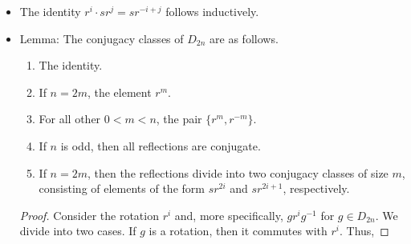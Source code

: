 \documentclass[../notes.tex]{subfiles}
\begin{document}
\begin{itemize}
\begin{figure}[H]
\begin{subfigure}[b]{0.3\linewidth}
            \caption{Rotation.}
            \label{fig:rotRefCommuteb}
        \end{subfigure}
        \caption{Commuting rotations and reflections.}
        \label{fig:rotRefCommute}
    \end{figure}
    \begin{proof}
        Let's consider the plane to be the complex plane, and represent points on the unit circle using the complex numbers $z=\e[i\gamma]$. In this case, we have that
        \begin{align*}
            s:\e[i\gamma] &\mapsto \e[i(2\alpha-\gamma)]&
            r:\e[i\gamma] &\mapsto \e[i(\gamma+\theta)]&
            r^{-1}:\e[i\gamma] &\mapsto \e[i(\gamma-\theta)]
        \end{align*}
        It follows that for any $\e[i\gamma]$ on the unit circle,
        \begin{equation*}
            [srs](\e[i\gamma]) = [sr](\e[i(2\alpha-\gamma)])
            = s(\e[i(2\alpha-\gamma+\theta)])
            = \e[i(2\alpha-(2\alpha-\gamma+\theta))]
            = \e[i(\gamma-\theta)]
            = r^{-1}(\e[i\gamma])
        \end{equation*}
        meaning that
        \begin{equation*}
            srs = r^{-1}
        \end{equation*}
        as desired.
    \end{proof}
    \item The identity $r^i\cdot sr^j=sr^{-i+j}$ follows inductively.
    \item Lemma: The conjugacy classes of $D_{2n}$ are as follows.
    \begin{enumerate}
        \item The identity.
        \item If $n=2m$, the element $r^m$.
        \item For all other $0<m<n$, the pair $\{r^m,r^{-m}\}$.
        \item If $n$ is odd, then all reflections are conjugate.
        \item If $n=2m$, then the reflections divide into two conjugacy classes of size $m$, consisting of elements of the form $sr^{2i}$ and $sr^{2i+1}$, respectively.
    \end{enumerate}
    \begin{proof}
        Consider the rotation $r^i$ and, more specifically, $gr^ig^{-1}$ for $g\in D_{2n}$. We divide into two cases. If $g$ is a rotation, then it commutes with $r^i$. Thus,

\end{proof}
\end{itemize}
\end{document}
